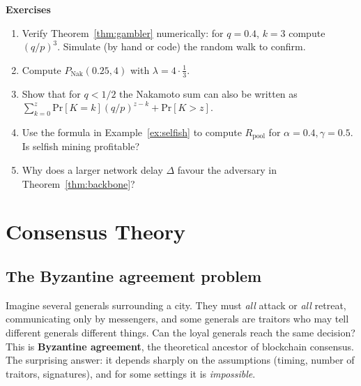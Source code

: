 \documentclass[11pt,a4paper]{article}
\newenvironment{plainenglish}{\par\smallskip}{\par\smallskip}
\newenvironment{exercisebox}{\par\medskip\noindent\textbf{Exercises}\par\nopagebreak\smallskip}{\par\medskip}
\theoremstyle{definition}
\theoremstyle{plain}
\theoremstyle{remark}
\renewcommand{\Pr}{\mathrm{Pr}}
\begin{document}
\begin{exercisebox}
\begin{enumerate}[nosep]
\item Verify Theorem~\ref{thm:gambler} numerically: for $q=0.4$, $k=3$ compute $(q/p)^3$. Simulate (by hand or code) the random walk to confirm.
\item Compute $P_{\text{Nak}}(0.25,4)$ with $\lambda=4\cdot\tfrac13$. 
\item Show that for $q<1/2$ the Nakamoto sum can also be written as $\sum_{k=0}^{z}\Pr[K=k](q/p)^{z-k}+\Pr[K>z]$.
\item Use the formula in Example~\ref{ex:selfish} to compute $R_{\text{pool}}$ for $\alpha=0.4,\gamma=0.5$. Is selfish mining profitable?
\item Why does a larger network delay $\Delta$ favour the adversary in Theorem~\ref{thm:backbone}?
\end{enumerate}
\end{exercisebox}
\section{Consensus Theory}\label{sec:consensus}

\subsection{The Byzantine agreement problem}

\begin{plainenglish}
Imagine several generals surrounding a city. They must \emph{all} attack or \emph{all} retreat, communicating only by messengers, and some generals are traitors who may tell different generals different things.
Can the loyal generals reach the same decision? This is \textbf{Byzantine agreement}, the theoretical ancestor of blockchain consensus. The surprising answer: it depends sharply on the assumptions (timing, number of traitors,
signatures), and for some settings it is \emph{impossible}.
\end{plainenglish}
\end{document}
